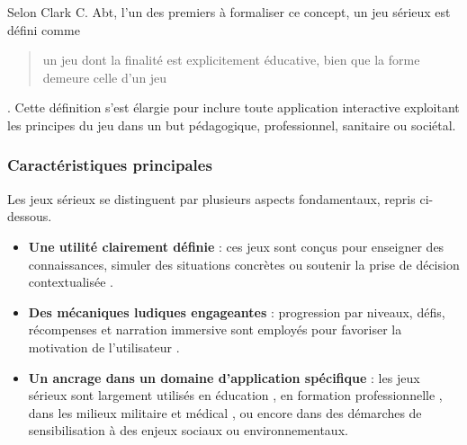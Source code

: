 Selon Clark C. Abt, l’un des premiers à formaliser ce concept, un jeu sérieux est défini comme \blockquote{un jeu dont la finalité est explicitement éducative, bien que la forme demeure celle d’un jeu} \autocite{abt_serious_1970}.
Cette définition s’est élargie pour inclure toute application interactive exploitant les principes du jeu dans un but pédagogique, professionnel, sanitaire ou sociétal.

\subsubsection{Caractéristiques principales}
Les jeux sérieux se distinguent par plusieurs aspects fondamentaux, repris ci-dessous.

\begin{itemize}
    \item \textbf{Une utilité clairement définie} : ces jeux sont conçus pour enseigner des connaissances, simuler des situations concrètes ou soutenir la prise de décision contextualisée \autocite{david_r_michael_serious_2006}.
    
    \item \textbf{Des mécaniques ludiques engageantes} : progression par niveaux, défis, récompenses et narration immersive sont employés pour favoriser la motivation de l’utilisateur \autocite{ute_ritterfeld_serious_2009}.
    
    \item \textbf{Un ancrage dans un domaine d’application spécifique} : les jeux sérieux sont largement utilisés en éducation \autocite{breuer_why_2010}, en formation professionnelle \autocite{r_realite_2021}, dans les milieux militaire et médical \autocite{axinesis_axinesis_nodate}, ou encore dans des démarches de sensibilisation à des enjeux sociaux \autocite{devresse_hunteroiinside-out_2023} ou environnementaux.
\end{itemize}
